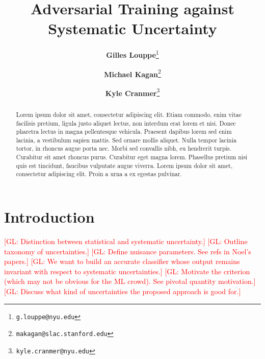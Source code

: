 \documentclass[twocolumn,superscriptaddress,aps]{revtex4-1}
\newcommand{\glnote}[1]{\textcolor{red}{[GL: #1]}}
\theoremstyle{plain}
\begin{document}

\title{\Large{Adversarial Training against Systematic Uncertainty}}
\vspace{1cm}
\author{\small{\bf Gilles Louppe}\thanks{\texttt{g.louppe@nyu.edu}}}
\author{\small{\bf Michael Kagan}\thanks{\texttt{makagan@slac.stanford.edu}}}
\author{\small{\bf Kyle Cranmer}\thanks{\texttt{kyle.cranmer@nyu.edu}}}

\begin{abstract}

Lorem ipsum dolor sit amet, consectetur adipiscing elit. Etiam commodo, enim
vitae facilisis pretium, ligula justo aliquet lectus, non interdum erat lorem et
nisi. Donec pharetra lectus in magna pellentesque vehicula. Praesent dapibus
lorem sed enim lacinia, a vestibulum sapien mattis. Sed ornare mollis aliquet.
Nulla tempor lacinia tortor, in rhoncus augue porta nec. Morbi sed convallis
nibh, eu hendrerit turpis. Curabitur sit amet rhoncus purus. Curabitur eget
magna lorem. Phasellus pretium nisi quis est tincidunt, faucibus vulputate augue
viverra. Lorem ipsum dolor sit amet, consectetur adipiscing elit. Proin a urna a
ex egestas pulvinar.

\end{abstract}

\maketitle



\section{Introduction}

\glnote{Distinction between statistical and systematic uncertainty.}
\glnote{Outline taxonomy of uncertainties.}
\glnote{Define nuisance parameters. See refs in Noel's papers.}
\glnote{We want to build an accurate classifier whose output remains invariant with
respect to systematic uncertainties.}
\glnote{Motivate the criterion (which may not be obvious for the ML crowd). See pivotal quantity motivation.}
\glnote{Discuss what kind of uncertainties the proposed approach is good for.}
\end{document}
